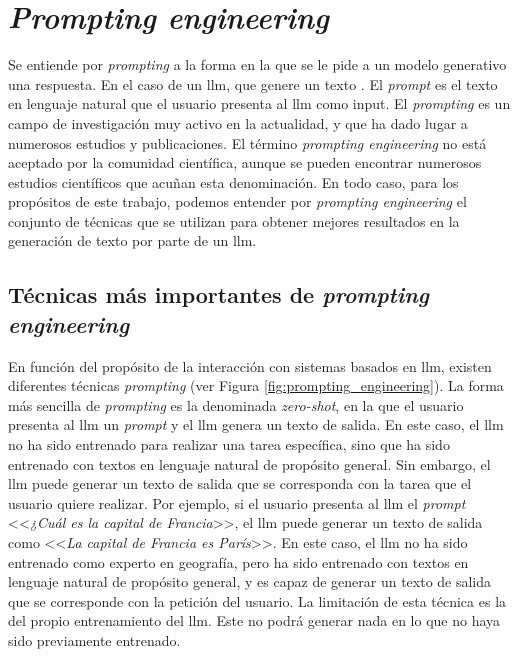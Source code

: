 \section{\textit{Prompting engineering}}
\label{sec:llm_tecnicas_prompting}

Se entiende por \textit{prompting} a la forma en la que se le pide a un modelo generativo una respuesta. En el caso de un \gls{llm}, que genere un texto \citep{LLMPromptingGuide}. El \textit{prompt} es el texto en lenguaje natural que el usuario presenta al \gls{llm} como input. El \textit{prompting} es un campo de investigación muy activo en la actualidad, y que ha dado lugar a numerosos estudios y publicaciones. El término \textit{prompting engineering} no está aceptado por la comunidad científica, aunque se pueden encontrar numerosos estudios científicos que acuñan esta denominación. En todo caso, para los propósitos de este trabajo, podemos entender por \textit{prompting engineering} el conjunto de técnicas que se utilizan para obtener mejores resultados en la generación de texto por parte de un \gls{llm}. 

\subsection{Técnicas más importantes de \textit{prompting engineering}}

En función del propósito de la interacción con sistemas basados en \gls{llm}, existen diferentes técnicas \textit{prompting} (ver Figura \ref{fig:prompting_engineering}). La forma más sencilla de \textit{prompting} es la denominada \textit{zero-shot}, en la que el usuario presenta al \gls{llm} un \textit{prompt} y el \gls{llm} genera un texto de salida. En este caso, el \gls{llm} no ha sido entrenado para realizar una tarea específica, sino que ha sido entrenado con textos en lenguaje natural de propósito general. Sin embargo, el \gls{llm} puede generar un texto de salida que se corresponda con la tarea que el usuario quiere realizar. Por ejemplo, si el usuario presenta al \gls{llm} el \textit{prompt} <<\textit{¿Cuál es la capital de Francia}>>, el \gls{llm} puede generar un texto de salida como <<\textit{La capital de Francia es París}>>. En este caso, el \gls{llm} no ha sido entrenado como experto en geografía, pero ha sido entrenado con textos en lenguaje natural de propósito general, y es capaz de generar un texto de salida que se corresponde con la petición del usuario. La limitación de esta técnica es la del propio entrenamiento del \gls{llm}. Este no podrá generar nada en lo que no haya sido previamente entrenado.



